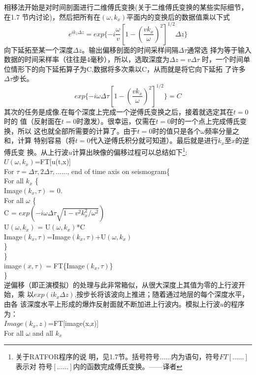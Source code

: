 相移法开始是对时间剖面进行二维傅氏变换(关于二维傅氏变换的某些实际细节，在1.7
节内讨论)，然后把所有在$(\omega,k_x)$平面内的变换后的数据值乘以下式
\begin{equation}
e^{ik_z\Delta z}=exp\{-i\frac{\omega}{v}[1-(\frac{vk_x}{\omega})^2]^{1/2}\Delta z\}
\label{eq:ex1.3.4}
\end{equation}
向下延拓至某一个深度$\Delta z$。输出偏移剖面的时间采样间隔$\Delta\tau$通常选
择为等于输入数据的时间采样率（往往是4毫秒），所以，选取深度为$\Delta z=v\Delta\tau$
时，一个时间单位情形下的向下延拓算子为C,数据将多次乘以C，从而就是将它向下延拓
了许多$\Delta\tau$步长。
\begin{equation}
exp\{-i\omega\Delta\tau[1-(\frac{vk_x}{\omega})^2]^{1/2}\}=C
\label{eq:ex1.3.5}
\end{equation}
其次的任务是成像.在每个深度上完成一个逆傅氏变换之后，接着就选定其在$t=0$时的
值（反射面在$t=0$时激发）。很幸运，仅需在$t=0$时的一个点上完成傅氏变换，所以
这也就全部所需要的计算了。由于$t=0$时的值只是各个$\omega$频率分量之和，计算
特别容易（将$t=0$代入逆傅氏积分就可知道）。最后就是进行$k_x$至$x$的逆傅氏变
换。从上行波$u$计算出映像的偏移过程可以总结如下\footnote{关于RATFOR程序的说
明，见1.7节。括号符号${\ldots\ldots}$内为语句，符号$FT[\ldots\ldots]$表示对
符号$[\ldots\ldots]$内的函数完成傅氏变换。——译者}:\\
$U(\omega,k_x)$=FT[u(t,x)]\\
For $\tau=\Delta\tau,2\Delta\tau,\ldots\ldots$, end of time axis on seismogram\{\\
For all $k_x$ \{\\
 Image$(k_x,\tau)$ = 0.\\
		For all $\omega$ \{\\
			C = $exp(-i\omega\Delta\tau\sqrt{1-v^2k_x^2/\omega^2})$\\
			U$(\omega,k_x)$ = U$(\omega,k_x)$*C\\
			Image$(k_x,\tau)$=Image$(k_x,\tau)$+U$(\omega,k_x)$\\
		\}\\
	\}\\
	image$(x,\tau)$ = FT\{Image$(k_x,\tau)$\}\\
\}\\
逆偏移（即正演模拟）的处理与此非常箱似，从很大深度上其值为零的上行波开始，乘
以$exp(ik_x\Delta z)$,按步长将该波向上推进；随着通过地层的每个深度水平，由各
该深度水平上形成的爆炸反射面就不断加进上行波内。模拟上行波$u$的程序为：\\
$Image(k_x,z)$=FT[image(x,z)]\\
For all $\omega$ and all $k_x$\\
